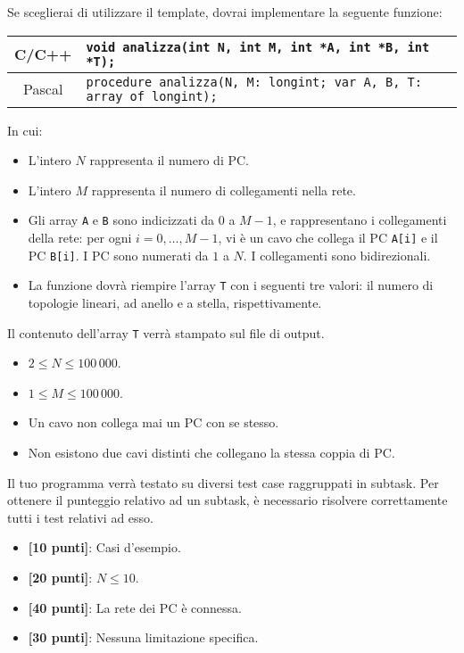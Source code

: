 Se sceglierai di utilizzare il template, dovrai implementare la seguente funzione:
\begin{center}\begin{tabularx}{\textwidth}{|c|X|}
\hline
C/C++  & \verb|void analizza(int N, int M, int *A, int *B, int *T);|\\
\hline
Pascal & \verb|procedure analizza(N, M: longint; var A, B, T: array of longint);|\\
\hline
\end{tabularx}\end{center}
In cui:
\begin{itemize}[nolistsep]
  \item L'intero $N$ rappresenta il numero di PC.
  \item L'intero $M$ rappresenta il numero di collegamenti nella rete.
  \item Gli array \texttt{A} e \texttt{B} sono indicizzati da $0$ a $M-1$, e rappresentano i collegamenti della rete: per ogni $i=0,\dots, M-1$, vi è un cavo che collega il PC \texttt{A[i]} e il PC \texttt{B[i]}. I PC sono numerati da $1$ a $N$. I collegamenti sono bidirezionali.
  \item La funzione dovrà riempire l'array \texttt{T} con i seguenti tre valori: il numero di topologie lineari, ad anello e a stella, rispettivamente.
\end{itemize}
Il contenuto dell'array \texttt{T} verrà stampato sul file di output.

\Constraints
\begin{itemize}[nolistsep, itemsep=2mm]
  \item $2 \le N \le 100\,000$.
  \item $1 \le M \le 100\,000$.
  \item Un cavo non collega mai un PC con se stesso.
  \item Non esistono due cavi distinti che collegano la stessa coppia di PC.
\end{itemize}

\Scoring
Il tuo programma verrà testato su diversi test case raggruppati in subtask.
Per ottenere il punteggio relativo ad un subtask, è necessario risolvere
correttamente tutti i test relativi ad esso.

\begin{itemize}[nolistsep,itemsep=2mm]
  \item \textbf{ [10 punti]}: Casi d'esempio.
  \item \textbf{ [20 punti]}: $N \leq 10$.
  \item \textbf{ [40 punti]}: La rete dei PC è connessa.
  \item \textbf{ [30 punti]}: Nessuna limitazione specifica.
\end{itemize}

